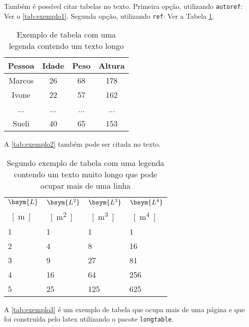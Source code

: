 Também é possível citar tabelas no texto. Primeira opção, utilizando \texttt{autoref}: Ver o \autoref{tab:exemplo1}. Segunda opção, utilizando  \texttt{ref}: Ver a Tabela \ref{tab:exemplo1}.

\begin{table}[htb]
	\captionsetup{width=0.33\textwidth}
	\centering
	\caption{\label{tab:exemplo1}Exemplo de tabela com uma legenda contendo um texto longo}
	\begin{tabular}{cccc}
		\hline
		\textbf{Pessoa} & \textbf{Idade} & \textbf{Peso} & \textbf{Altura} \\ \hline
		Marcos          & 26             & 68            & 178             \\
		Ivone           & 22             & 57            & 162             \\
		...             & ...            & ...           & ...             \\
		Sueli           & 40             & 65            & 153             \\ \hline
	\end{tabular}
	\fonte{}
\end{table}

A \autoref{tab:exemplo2} também pode ser citada no texto.

\begin{table}[htb]
	\caption{Segundo exemplo de tabela com uma legenda contendo um texto muito longo que pode ocupar mais de uma linha}
	\label{tab:exemplo2}
	\begin{tabularx}{\textwidth}{@{\extracolsep{\fill}}llll}
		\toprule
		$\bsym{L}$ & $\bsym{L^2}$ & $\bsym{L^3}$ & $\bsym{L^4}$ \\
		\SI{}{[m]} & \SI{}{[m^2]} & \SI{}{[m^3]} & \SI{}{[m^4]} \\ \midrule
		1          & 1            & 1            & 1            \\
		2          & 4            & 8            & 16           \\
		3          & 9            & 27           & 81           \\
		4          & 16           & 64           & 256          \\
		5          & 25           & 125          & 625          \\ \bottomrule
	\end{tabularx}
	\fonte{}
\end{table}

A \autoref{tab:exemplo3} é um exemplo de tabela que ocupa mais de uma página e que foi construída pelo \gls{latex} utilizando o pacote \texttt{longtable}.

